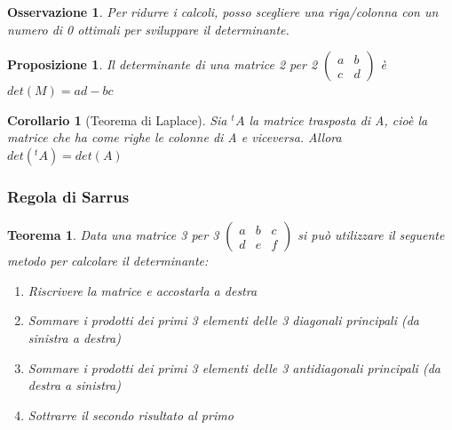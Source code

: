 \documentclass[12pt]{article}
\newenvironment{para}{\begin{adjustwidth}{13mm}{}}{\end{adjustwidth}}
\newtheorem{Corollario}{Corollario}[subsection]
\newtheorem{Teorema}{Teorema}[subsection]
\newtheorem{Proposizione}{Proposizione}[subsection]
\newtheorem{Osservazione}{Osservazione}[subsection]
\begin{document}
\begin{para}
\begin{Osservazione}
    Per ridurre i calcoli, posso scegliere una riga/colonna con un numero di 0 ottimali per sviluppare il determinante.
\end{Osservazione}
\begin{Proposizione}
Il determinante di una matrice 2 per 2 $\begin{pmatrix}
    a & b \\
    c & d
\end{pmatrix}$ è $det(M) = ad - bc$
\end{Proposizione}

\begin{Corollario}[Teorema di Laplace]
    Sia $^tA$ la matrice trasposta di A, cioè la matrice che ha come righe le colonne di A e viceversa. Allora $det(^tA)=det(A)$
\end{Corollario}

\subsubsection{Regola di Sarrus}
\begin{Teorema}
    Data una matrice 3 per 3 $\begin{pmatrix}
    a & b  & c\\
    d & e  & f
\end{pmatrix}$ si può utilizzare il seguente metodo per calcolare il determinante: \begin{enumerate}
    \item Riscrivere la matrice e accostarla a destra
    \item Sommare i prodotti dei primi 3 elementi delle 3 diagonali principali (da sinistra a destra)
    \item Sommare i prodotti dei primi 3 elementi delle 3 antidiagonali principali (da destra a sinistra)
    \item Sottrarre il secondo risultato al primo
\end{enumerate}    
\end{Teorema}


\end{para}
\end{document}
